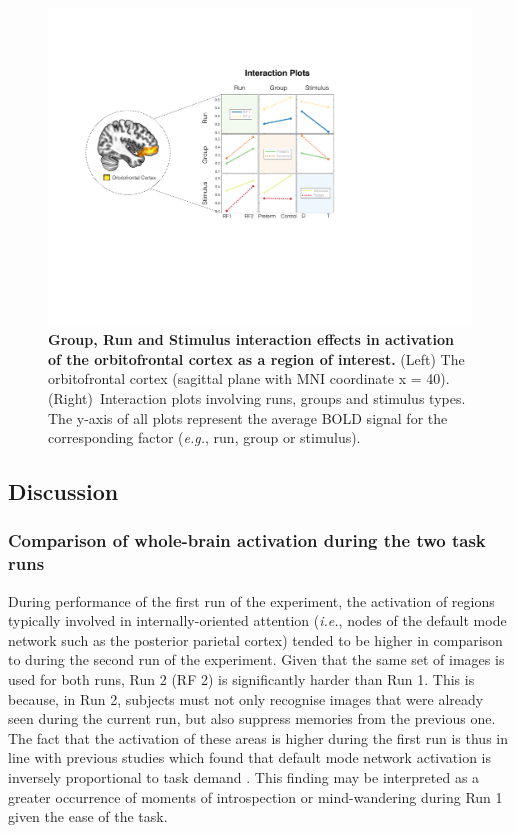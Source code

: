\begin{figure}[h]
\centering\includegraphics[width=1\linewidth]{images/Ch4/Ch4_ROI_Interactions.pdf}
\caption{\textbf{Group, Run and Stimulus interaction effects in activation of the orbitofrontal cortex as a region of interest.} (Left) The orbitofrontal cortex (sagittal plane with MNI coordinate x = 40). (Right)~Interaction plots involving runs, groups and stimulus types. The y-axis of all plots represent the average BOLD signal for the corresponding factor (\textit{e.g.}, run, group or stimulus). } \label{fig:ch4_ROI_Interactions}
\end{figure} 







\subsection{Discussion}

\subsubsection{Comparison of whole-brain activation during the two task runs}

 During performance of the first run of the experiment, the activation of regions typically involved in internally-oriented attention (\textit{i.e.}, nodes of the default mode network such as the posterior parietal cortex) tended to be higher in comparison to during the second run of the experiment. Given that the same set of images is used for both runs, Run 2 (RF 2) is significantly harder than Run 1. This is because, in Run 2, subjects must not only recognise images that were already seen during the current run, but also suppress memories from the previous one. The fact that the activation of these areas is higher during the first run is thus in line with previous studies which found that default mode network activation is inversely proportional to task demand \citep{Ceko2015}. This finding may be interpreted as a greater occurrence of moments of introspection or mind-wandering during Run 1 given the ease of the task.

